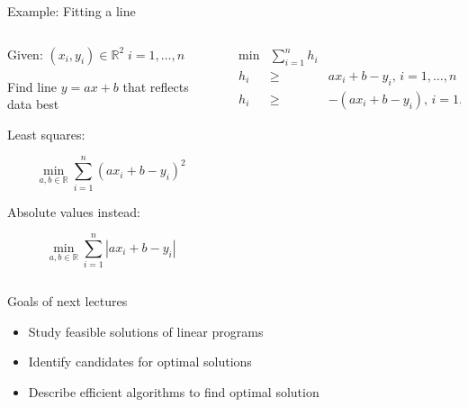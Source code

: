 \begin{frame}{Example: Fitting a line}

  \begin{columns}
    \begin{column}{.5\textwidth}
      Given: $(x_i,y_i)\in ℝ^2 \; i=1,\ldots,n$
      
      
      \medskip
      
      Find line $y = ax + b$ that reflects data best


      \medskip
      Least squares:

      \begin{equation*}        
        \min_{a,b ∈ ℝ}  \sum_{i=1}^n (ax_i + b-y_i)^2  
      \end{equation*}


      \bigskip 
      Absolute values instead:

      \begin{displaymath}        
      \min_{a,b ∈ ℝ}  \sum_{i=1}^n |ax_i + b-y_i|
      \end{displaymath}
      
      
      
    \end{column}
    \begin{column}{.5\textwidth}

      \begin{equation*}
        \begin{array}{lcr}
          \min & \sum_{i=1}^n h_i \\
          h_i & \geq & a x_i + b-y_i,  \, i=1,\ldots,n \\
          h_i & \geq & -(a x_i + b-y_i ),  \, i=1,\ldots,n \\    
        \end{array}
      \end{equation*}

    \end{column}       
  \end{columns}
\end{frame}




\begin{frame}{}
  \begin{alertblock}{Goals of next lectures}
    \begin{itemize}
    \item Study feasible solutions of linear programs
    \item Identify candidates for optimal solutions
    \item Describe efficient algorithms to find optimal solution 
    \end{itemize}
  \end{alertblock}

\end{frame}







